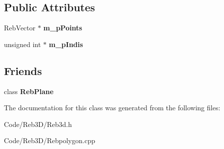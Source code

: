 \subsection*{Public Attributes}
\begin{DoxyCompactItemize}
\item 
Reb\+Vector $\ast$ {\bfseries m\+\_\+p\+Points}\hypertarget{class_reb_polygon_a0dc3057c75cb75e099fbdcd9a4ecdf2a}{}\label{class_reb_polygon_a0dc3057c75cb75e099fbdcd9a4ecdf2a}

\item 
unsigned int $\ast$ {\bfseries m\+\_\+p\+Indis}\hypertarget{class_reb_polygon_a3bd0b8e3a0976aa686ba3cf31b0974b7}{}\label{class_reb_polygon_a3bd0b8e3a0976aa686ba3cf31b0974b7}

\end{DoxyCompactItemize}
\subsection*{Friends}
\begin{DoxyCompactItemize}
\item 
class {\bfseries Reb\+Plane}\hypertarget{class_reb_polygon_add0f2e2c20e4ce2125a22b2de27c14c5}{}\label{class_reb_polygon_add0f2e2c20e4ce2125a22b2de27c14c5}

\end{DoxyCompactItemize}


The documentation for this class was generated from the following files\+:\begin{DoxyCompactItemize}
\item 
Code/\+Reb3\+D/Reb3d.\+h\item 
Code/\+Reb3\+D/Rebpolygon.\+cpp\end{DoxyCompactItemize}
